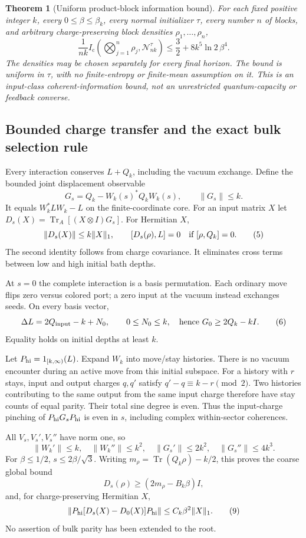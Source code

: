 \documentclass[11pt]{article}
\newtheorem{theorem}{Theorem}[section]
\newcommand{\Tr}{\operatorname{Tr}}
\newcommand{\norm}[1]{\lVert #1\rVert}
\newcommand{\Ic}{I_{\mathrm c}}
\begin{document}
\begin{theorem}[Uniform product-block information bound]\label{thm:upper}
For each fixed positive integer $k$, every $0\le\beta\le\beta_k$, every
normal initializer $\tau$, every number $n$ of blocks, and arbitrary
charge-preserving block densities $\rho_1,\ldots,\rho_n$,
\[
 \frac1{nk}\Ic\!\left(\bigotimes_{j=1}^n\rho_j,
                  \mathcal N_{nk}^{\tau}\right)
 \le\frac32+8k^5\ln2\,\beta^4.
 \tag{3}
\]
The densities may be chosen separately for every final horizon.
The bound is uniform in $\tau$, with no finite-entropy or finite-mean
assumption on it. This is an input-class coherent-information bound,
not an unrestricted quantum-capacity or feedback converse.
\end{theorem}

\subsection{Bounded charge transfer and the exact bulk selection rule}

Every interaction conserves $L+Q_k$, including the vacuum exchange.
Define the bounded joint displacement observable
\[
 G_s=Q_k-W_k(s)^*Q_kW_k(s),\qquad \norm{G_s}\le k.
 \tag{4}
\]
It equals $W_k^*LW_k-L$ on the finite-coordinate core. For an input matrix
$X$ let $D_s(X)=\Tr_A[(X\otimes I)G_s]$. For Hermitian $X$,
\[
 \norm{D_s(X)}\le k\norm X_1,\qquad
 [D_s(\rho),L]=0\quad\hbox{if }[\rho,Q_k]=0.
 \tag{5}
\]
The second identity follows from charge covariance. It eliminates cross
terms between low and high initial bath depths.

At $s=0$ the complete interaction is a basis permutation. Each ordinary
move flips zero versus colored port; a zero input at the vacuum instead
exchanges seeds. On every basis vector,
\[
 \Delta L=2Q_{\rm input}-k+N_0,\qquad 0\le N_0\le k,
 \quad\text{hence }G_0\ge2Q_k-kI.
 \tag{6}
\]
Equality holds on initial depths at least $k$.

Let $P_{\rm hi}=1_{[k,\infty)}(L)$. Expand $W_k$ into move/stay histories.
There is no vacuum encounter during an active move from this initial
subspace. For a history with $r$ stays, input and output charges $q,q'$
satisfy $q'-q\equiv k-r\pmod2$. Two histories contributing to the same
output from the same input charge therefore have stay counts of equal
parity. Their total sine degree is even. Thus the input-charge pinching
of $P_{\rm hi}G_sP_{\rm hi}$ is even in $s$, including complex
within-sector coherences.

All $V_s,V_s',V_s''$ have norm one, so
\[
 \norm{W_k'}\le k,\quad \norm{W_k''}\le k^2,\quad
 \norm{G_s'}\le2k^2,\quad \norm{G_s''}\le4k^3.
 \tag{7}
\]
For $\beta\le1/2$, $s\le2\beta/\sqrt3$.
Writing $m_\rho=\Tr(Q_k\rho)-k/2$, this proves the coarse global bound
\[
 D_s(\rho)\ge(2m_\rho-B_k\beta)I,
 \tag{8}
\]
and, for charge-preserving Hermitian $X$,
\[
 \norm{P_{\rm hi}[D_s(X)-D_0(X)]P_{\rm hi}}
 \le C_k\beta^2\norm X_1.
 \tag{9}
\]
No assertion of bulk parity has been extended to the root.
\end{document}
